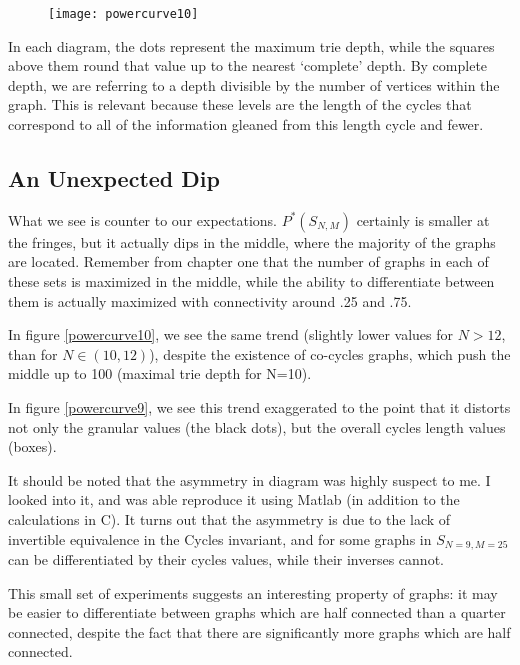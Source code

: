 \begin{figure}[h]
\label{fig:powercurve10}
\caption{}
\centering
\texttt{[image: powercurve10]}
\end{figure}

In each diagram, the dots represent the maximum trie depth, while the squares above them round that value up to the nearest `complete' depth.
By complete depth, we are referring to a depth divisible by the number of vertices within the graph.
This is relevant because these levels are the length of the cycles that correspond to all of the information gleaned from this length cycle and fewer.

\subsection{An Unexpected Dip}

What we see is counter to our expectations.
$P^*(S_{N, M})$ certainly is smaller at the fringes, but it actually dips in the middle, where the majority of the graphs are located.
Remember from chapter one that the number of graphs in each of these sets is maximized in the middle, while the ability to differentiate between them is actually maximized with connectivity around .25 and .75.

In figure \ref{powercurve10}, we see the same trend (slightly lower values for $N > 12$, than for $N \in (10, 12)$), despite the existence of co-cycles graphs, which push the middle up to 100 (maximal trie depth for N=10).

In figure \ref{powercurve9}, we see this trend exaggerated to the point that it distorts not only the granular values (the black dots), but the overall cycles length values (boxes).

It should be noted that the asymmetry in diagram \cite{powercurve9} was highly suspect to me.
I looked into it, and was able reproduce it using Matlab (in addition to the calculations in C).  
It turns out that the asymmetry is due to the lack of invertible equivalence in the Cycles invariant, and for some graphs in $S_{N=9, M=25}$ can be differentiated by their cycles values, while their inverses cannot.

This small set of experiments suggests an interesting property of graphs: it may be easier to differentiate between graphs which are half connected than a quarter connected, despite the fact that there are significantly more graphs which are half connected.
